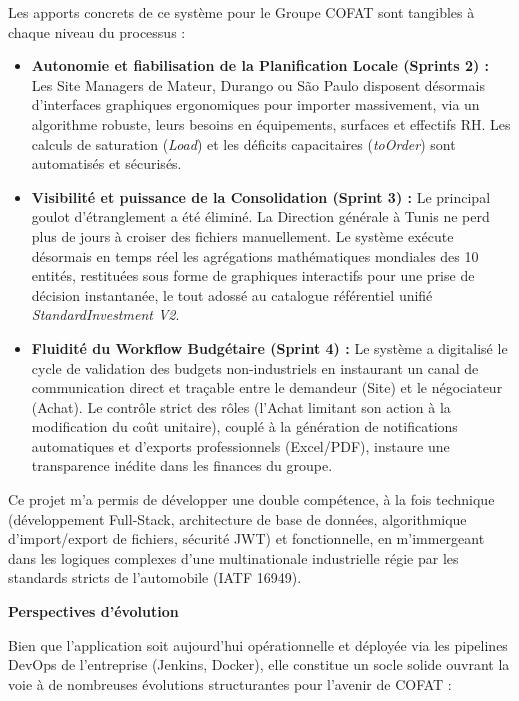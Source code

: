 Les apports concrets de ce système pour le Groupe COFAT sont tangibles à chaque niveau du processus :
\begin{itemize}
    \item \textbf{Autonomie et fiabilisation de la Planification Locale (Sprints 2) :} Les Site Managers de Mateur, Durango ou São Paulo disposent désormais d'interfaces graphiques ergonomiques pour importer massivement, via un algorithme robuste, leurs besoins en équipements, surfaces et effectifs RH. Les calculs de saturation (\textit{Load}) et les déficits capacitaires (\textit{toOrder}) sont automatisés et sécurisés.
    \item \textbf{Visibilité et puissance de la Consolidation (Sprint 3) :} Le principal goulot d'étranglement a été éliminé. La Direction générale à Tunis ne perd plus de jours à croiser des fichiers manuellement. Le système exécute désormais en temps réel les agrégations mathématiques mondiales des 10 entités, restituées sous forme de graphiques interactifs pour une prise de décision instantanée, le tout adossé au catalogue référentiel unifié \textit{StandardInvestment V2}.
    \item \textbf{Fluidité du Workflow Budgétaire (Sprint 4) :} Le système a digitalisé le cycle de validation des budgets non-industriels en instaurant un canal de communication direct et traçable entre le demandeur (Site) et le négociateur (Achat). Le contrôle strict des rôles (l'Achat limitant son action à la modification du coût unitaire), couplé à la génération de notifications automatiques et d'exports professionnels (Excel/PDF), instaure une transparence inédite dans les finances du groupe.
\end{itemize}

Ce projet m'a permis de développer une double compétence, à la fois technique (développement Full-Stack, architecture de base de données, algorithmique d'import/export de fichiers, sécurité JWT) et fonctionnelle, en m'immergeant dans les logiques complexes d'une multinationale industrielle régie par les standards stricts de l'automobile (IATF 16949).

\textbf{Perspectives d'évolution}

Bien que l'application soit aujourd'hui opérationnelle et déployée via les pipelines DevOps de l'entreprise (Jenkins, Docker), elle constitue un socle solide ouvrant la voie à de nombreuses évolutions structurantes pour l'avenir de COFAT :


